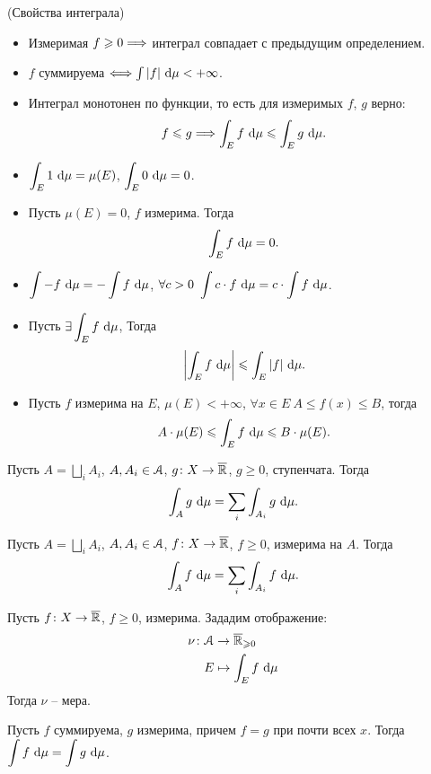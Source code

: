 \begin{theorem}(Свойства интеграла)
	\enewline

	\begin{itemize}
		\item Измеримая $f \geqslant 0 \Longrightarrow$ интеграл совпадает с предыдущим определением.
		\item $f$ суммируема $\Longleftrightarrow \int{|f| ~\mathrm{d}\mu} < +\infty$. 
        \item Интеграл монотонен по функции, то есть для измеримых $f$, $g$ верно:
\[
    f \leqslant g \Longrightarrow \int_{E}{f ~\mathrm{d}\mu} \leqslant \int_{E}{g ~\mathrm{d}\mu}
.\] 
        \item $\displaystyle \int_E{1 ~\mathrm{d}\mu} = \mu(E)$, $\displaystyle \int_E{0 ~\mathrm{d}\mu} = 0$.
        \item Пусть $\mu(E) = 0$, $f$ измерима. Тогда
\[
    \int_E{f ~\mathrm{d}\mu} = 0
.\] 
        \item $\displaystyle \int{-f ~\mathrm{d}\mu} = -\int{f ~\mathrm{d}\mu}$, $\displaystyle 
               \forall c > 0~ \int{c \cdot f ~\mathrm{d}\mu} = c \cdot \int{f ~\mathrm{d}\mu}$.
        \item Пусть $\displaystyle \exists \int_E{f ~\mathrm{d}\mu}$, Тогда
\[
    \left|{\int_E{f ~\mathrm{d}\mu}}\right| \leqslant {\int_E{|f| ~\mathrm{d}\mu}}
.\] 
        \item Пусть $f$ измерима на $E$, $\mu(E) < +\infty$, 
            $\forall x \in E~ A \leqslant f(x) \leqslant B$,
            тогда
\[
    A \cdot \mu(E) \leqslant \int_E{f ~\mathrm{d}\mu} \leqslant B \cdot \mu(E)
.\] 
	\end{itemize}
\end{theorem}

\begin{lemma}
    Пусть $A = \bigsqcup_i{A_i}$, $A, A_i \in \mathcal{A}$, $g \colon X \to \overline{\mathbb{R}}$, $g \geqslant 0$, 
    ступенчата. Тогда
\[
    \int_A{g ~\mathrm{d}\mu} = \sum_i{\int_{A_i}{g ~\mathrm{d}\mu}}
.\] 
\end{lemma}

\begin{theorem}
    Пусть $A = \bigsqcup_i{A_i}$, $A, A_i \in \mathcal{A}$, $f \colon X \to \overline{\mathbb{R}}$, $f \geqslant 0$,
    измерима на $A$. Тогда
\[
    \int_A{f ~\mathrm{d}\mu} = \sum_i{\int_{A_i}{f ~\mathrm{d}\mu}}
.\] 
\end{theorem}

\begin{corollary}
    Пусть $f \colon X \to \overline{\mathbb{R}}$, $f \geqslant 0$, измерима. Зададим отображение:
    \begin{align*}
        \nu \colon &\mathcal{A} \to \overline{\mathbb{R}}_{\geqslant 0} \\ 
                   &E \mapsto \int_E{f ~\mathrm{d}\mu}
    \end{align*}
    Тогда $\nu$ -- мера.
\end{corollary}

\begin{lemma}
    Пусть $f$ суммируема, $g$ измерима, причем $f = g$ при почти всех $x$. Тогда
    $\displaystyle \int{f ~\mathrm{d}\mu} = \int{g ~\mathrm{d}\mu}$.
\end{lemma}
